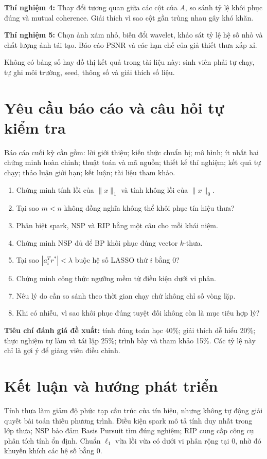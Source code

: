 \documentclass[12pt,a4paper]{article}
\begin{document}
\textbf{Thí nghiệm 4:} Thay đổi tương quan giữa các cột của $A$, so sánh tỷ lệ khôi phục đúng và mutual coherence. Giải thích vì sao cột gần trùng nhau gây khó khăn.

\textbf{Thí nghiệm 5:} Chọn ảnh xám nhỏ, biến đổi wavelet, khảo sát tỷ lệ hệ số nhỏ và chất lượng ảnh tái tạo. Báo cáo PSNR và các hạn chế của giả thiết thưa xấp xỉ.

Không có bảng số hay đồ thị kết quả trong tài liệu này: sinh viên phải tự chạy, tự ghi môi trường, seed, thông số và giải thích số liệu.
\clearpage
\section{Yêu cầu báo cáo và câu hỏi tự kiểm tra}
Báo cáo cuối kỳ cần gồm: lời giới thiệu; kiến thức chuẩn bị; mô hình; ít nhất hai chứng minh hoàn chỉnh; thuật toán và mã nguồn; thiết kế thí nghiệm; kết quả tự chạy; thảo luận giới hạn; kết luận; tài liệu tham khảo.

\begin{enumerate}
\item Chứng minh tính lồi của $\|x\|_1$ và tính không lồi của $\|x\|_0$.
\item Tại sao $m<n$ không đồng nghĩa không thể khôi phục tín hiệu thưa?
\item Phân biệt spark, NSP và RIP bằng một câu cho mỗi khái niệm.
\item Chứng minh NSP đủ để BP khôi phục đúng vector $k$-thưa.
\item Tại sao $|a_i^Tr^*|<\lambda$ buộc hệ số LASSO thứ $i$ bằng 0?
\item Chứng minh công thức ngưỡng mềm từ điều kiện dưới vi phân.
\item Nêu lý do cần so sánh theo thời gian chạy chứ không chỉ số vòng lặp.
\item Khi có nhiễu, vì sao khôi phục đúng tuyệt đối không còn là mục tiêu hợp lý?
\end{enumerate}

\textbf{Tiêu chí đánh giá đề xuất:} tính đúng toán học 40\%; giải thích dễ hiểu 20\%; thực nghiệm tự làm và tái lập 25\%; trình bày và tham khảo 15\%. Các tỷ lệ này chỉ là gợi ý để giảng viên điều chỉnh.
\clearpage
\section{Kết luận và hướng phát triển}
Tính thưa làm giảm độ phức tạp cấu trúc của tín hiệu, nhưng không tự động giải quyết bài toán thiếu phương trình. Điều kiện spark mô tả tính duy nhất trong lớp thưa; NSP bảo đảm Basis Pursuit tìm đúng nghiệm; RIP cung cấp công cụ phân tích tính ổn định. Chuẩn $\ell_1$ vừa lồi vừa có dưới vi phân rộng tại 0, nhờ đó khuyến khích các hệ số bằng 0.
\end{document}
